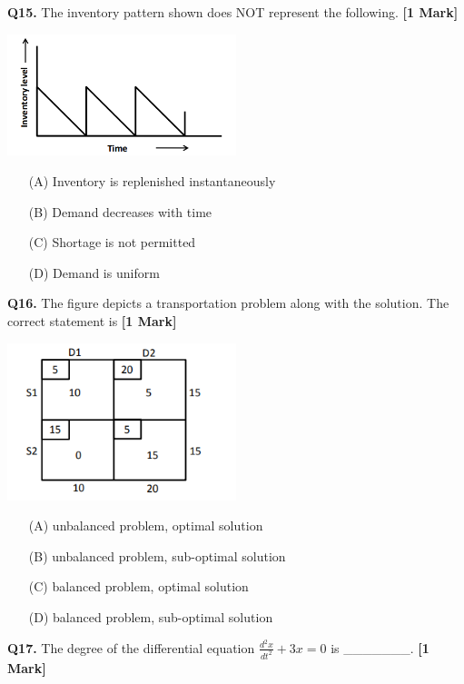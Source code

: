 \documentclass[11pt]{article}
\newcommand{\questiona}[2]{
    \noindent\textbf{Q#2.} #1 \hfill \textbf{[1 Mark]}
}
\begin{document}
\vspace{0.5cm}

\questiona{The inventory pattern shown does NOT represent the following.}{15}
\begin{center}
\includegraphics[width=0.5\textwidth]{figures/15.png}
\end{center}
\begin{enumerate}
    \item[(A)] Inventory is replenished instantaneously
    \item[(B)] Demand decreases with time
    \item[(C)] Shortage is not permitted
    \item[(D)] Demand is uniform
\end{enumerate}
\vspace{0.5cm}

\questiona{The figure depicts a transportation problem along with the solution. The correct statement is}{16}
\begin{center}
\includegraphics[width=0.5\textwidth]{figures/16.png}
\end{center}
\begin{enumerate}
    \item[(A)] unbalanced problem, optimal solution
    \item[(B)] unbalanced problem, sub-optimal solution
    \item[(C)] balanced problem, optimal solution
    \item[(D)] balanced problem, sub-optimal solution
\end{enumerate}
\vspace{0.5cm}

\questiona{The degree of the differential equation \(\frac{d^2x}{dt^2} + 3x = 0\) is \_\_\_\_\_\_\_.}{17}
\vspace{0.5cm}
\end{document}
